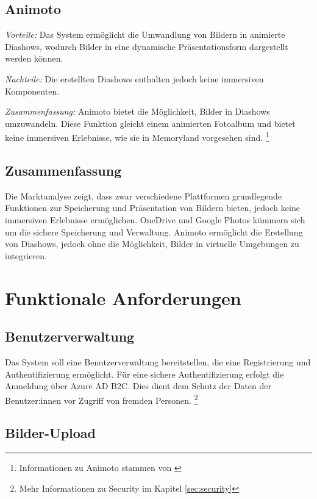 \subsection{Animoto}

\emph{Vorteile:}
Das System ermöglicht die Umwandlung von Bildern in animierte Diashows,
wodurch Bilder in eine dynamische Präsentationsform dargestellt werden
können.

\emph{Nachteile:}
Die erstellten Diashows enthalten jedoch keine immersiven Komponenten.

\emph{Zusammenfassung:}
Animoto bietet die Möglichkeit, Bilder in Diashows umzuwandeln. Diese Funktion gleicht 
einem animierten Fotoalbum und bietet keine immersiven Erlebnisse, wie sie in Memoryland
vorgesehen sind. \footnote{Informationen zu Animoto stammen von \cite{Animoto}}

\subsection{Zusammenfassung}

Die Marktanalyse zeigt, dass zwar verschiedene Plattformen grundlegende 
Funktionen zur Speicherung und Präsentation von Bildern bieten, jedoch 
keine immersiven Erlebnisse ermöglichen. OneDrive und Google Photos kümmern 
sich um die sichere Speicherung und Verwaltung. Animoto ermöglicht die 
Erstellung von Diashows, jedoch ohne die Möglichkeit, Bilder in virtuelle 
Umgebungen zu integrieren.

\section{Funktionale Anforderungen}

\subsection{Benutzerverwaltung}

Das System soll eine Benutzerverwaltung bereitstellen, die eine Registrierung 
und Authentifizierung ermöglicht. Für eine sichere Authentifizierung erfolgt
die Anmeldung über Azure AD B2C. Dies dient dem Schutz der Daten der Benutzer:innen
vor Zugriff von fremden Personen.
\footnote{Mehr Informationen zu Security im Kapitel \ref{sec:security}}

\subsection{Bilder-Upload}

